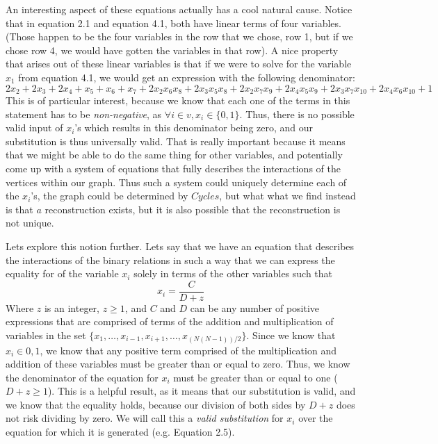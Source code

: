 An interesting aspect of these equations actually has a cool natural cause.  
Notice that in equation 2.1 and equation 4.1, both have linear terms of four variables.  
(Those happen to be the four variables in the row that we chose, row 1, but if we chose row 4, we would have gotten the variables in that row). 
A nice property that arises out of these linear variables is that if we were to solve for the variable $x_1$ from equation 4.1, we would get an expression with the following denominator: 
$$2x_2 + 2x_3 + 2x_4 + x_5 + x_6 + x_7 + 2x_2x_6x_8 + 2x_3x_5x_8 + 2x_2x_7x_9 + 2x_4x_5x_9 + 2x_3x_7x_{10} + 2x_4x_6x_{10} + 1$$
This is of particular interest, because we know that each one of the terms in this statement has to be \emph{non-negative}, as $\forall i \in v,  x_i \in \{0, 1\}$.  
Thus, there is no possible valid input of $x_i$'s which results in this denominator being zero, and our substitution is thus universally valid.  
That is really important because it means that we might be able to do the same thing for other variables, and potentially come up with a system of equations that fully describes the interactions of the vertices within our graph. 
Thus such a system could uniquely determine each of the $x_i$'s, the graph could be determined by $Cycles$, but what what we find instead is that $a$ reconstruction exists, but it is also possible that the reconstruction is not unique.

Lets explore this notion further.  
Lets say that we have an equation that describes the interactions of the binary relations in such a way that we can express the equality for of the variable 
$x_i$ solely in terms of the other variables such that $$x_i = \frac{C}{D + z}$$ Where $z$ is an integer, $z \geq 1$, and $C$ and $D$ 
can be any number of positive expressions that are comprised of terms of the addition and multiplication of variables in the set 
$\{x_1, \dots,  x_{i-1},x_{i+1}, \dots, x_{(N(N-1))/2}\}$.  Since we know that $x_i \in {0,1}$, we know that any positive term comprised of the multiplication and addition of these variables must be greater than or equal to zero.  
Thus, we know the denominator of the equation for $x_i$ must be greater than or equal to one ($D + z \geq 1$). 
This is a helpful result, as it means that our substitution is valid, and we know that the equality holds, because our division of both sides by $D + z$ 
does not risk dividing by zero.  We will call this a \emph{valid substitution} for $x_i$ over the equation for which it is generated (e.g. Equation 2.5). 

